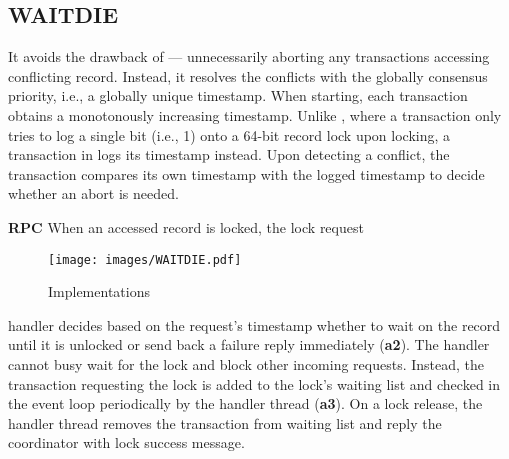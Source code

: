 \subsection{WAITDIE}


It avoids the drawback of \nowait --- unnecessarily aborting any transactions accessing conflicting record.
Instead, it resolves the conflicts with the globally consensus priority, i.e., a globally unique timestamp. When starting, each transaction 
obtains a monotonously increasing timestamp. Unlike \nowait, where a transaction only tries to log a single bit (i.e., 1) onto a 64-bit record lock upon locking, a transaction in \waitdie logs its timestamp instead. Upon detecting a conflict, the transaction compares its own timestamp with the logged timestamp to decide whether an abort is needed.

{\bf RPC} When an accessed record is locked, the lock request 
\setlength{\intextsep}{2pt}%
\setlength{\columnsep}{8pt}%
\begin{wrapfigure}[9]{r}{.50\linewidth}
    \centering
    \vspace{-0.2cm}
    \texttt{[image: images/WAITDIE.pdf]}
    \vspace{-0.8cm}
    \caption{\waitdie Implementations
    }
    \vspace{-0.2cm}
    \label{fig:waitdie}
\end{wrapfigure}
handler decides
based on the request's timestamp 
whether to wait on the record until it is unlocked 
or send back a failure reply immediately (\step \textbf{a2}).
The handler cannot busy wait for the lock and block other incoming requests. Instead, the transaction requesting the lock is added to 
the lock's waiting list and checked in the event loop periodically by the handler thread (\step \textbf{a3}). On a lock release, the handler thread removes the transaction from waiting list and reply the coordinator with lock success message.

